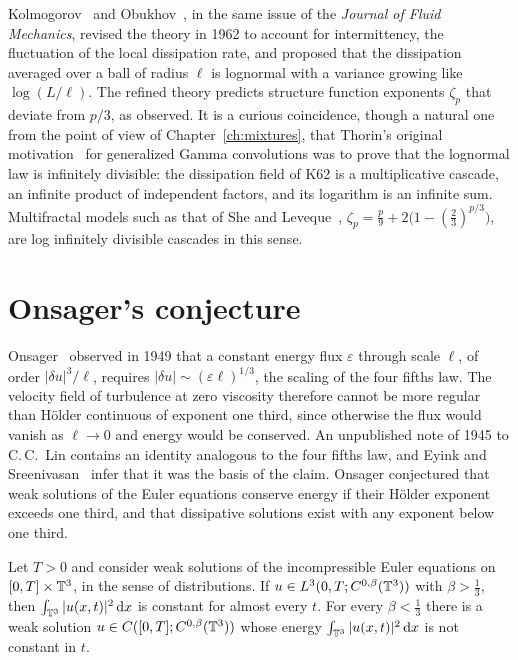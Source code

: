 Kolmogorov~\cite{kolmogorov1962} and Obukhov~\cite{obukhov1962}, in the same issue of the \emph{Journal of Fluid Mechanics}, revised the theory in 1962 to account for intermittency, the fluctuation of the local dissipation rate, and proposed that the dissipation averaged over a ball of radius $\ell$ is lognormal with a variance growing like $\log(L/\ell)$. The refined theory predicts structure function exponents $\zeta_p$ that deviate from $p/3$, as observed. It is a curious coincidence, though a natural one from the point of view of Chapter~\ref{ch:mixtures}, that Thorin's original motivation~\cite{thorin1977} for generalized Gamma convolutions was to prove that the lognormal law is infinitely divisible: the dissipation field of K62 is a multiplicative cascade, an infinite product of independent factors, and its logarithm is an infinite sum. Multifractal models such as that of She and Leveque~\cite{sheleveque1994}, $\zeta_p = \frac p9+2\big(1-(\frac23)^{p/3}\big)$, are log infinitely divisible cascades in this sense.

\section{Onsager's conjecture}\label{sec:onsager_conjecture}

Onsager~\cite{onsager1949} observed in 1949 that a constant energy flux $\varepsilon$ through scale $\ell$, of order $|\delta u|^3/\ell$, requires $|\delta u|\sim(\varepsilon\ell)^{1/3}$, the scaling of the four fifths law. The velocity field of turbulence at zero viscosity therefore cannot be more regular than H\"older continuous of exponent one third, since otherwise the flux would vanish as $\ell\to0$ and energy would be conserved. An unpublished note of 1945 to C.\,C.~Lin contains an identity analogous to the four fifths law, and Eyink and Sreenivasan~\cite{eyinksreenivasan2006} infer that it was the basis of the claim. Onsager conjectured that weak solutions of the Euler equations conserve energy if their H\"older exponent exceeds one third, and that dissipative solutions exist with any exponent below one third.

\begin{theorem}
\label{thm:onsager}
Let $T>0$ and consider weak solutions of the incompressible Euler equations on $[0,T]\times\mathbb{T}^3$, in the sense of distributions. If $u\in L^3(0,T;C^{0,\beta}(\mathbb{T}^3))$ with $\beta>\frac13$, then $\int_{\mathbb{T}^3}|u(x,t)|^2\,\mathrm{d} x$ is constant for almost every $t$. For every $\beta<\frac13$ there is a weak solution $u\in C([0,T];C^{0,\beta}(\mathbb{T}^3))$ whose energy $\int_{\mathbb{T}^3}|u(x,t)|^2\,\mathrm{d} x$ is not constant in $t$.
\end{theorem}

